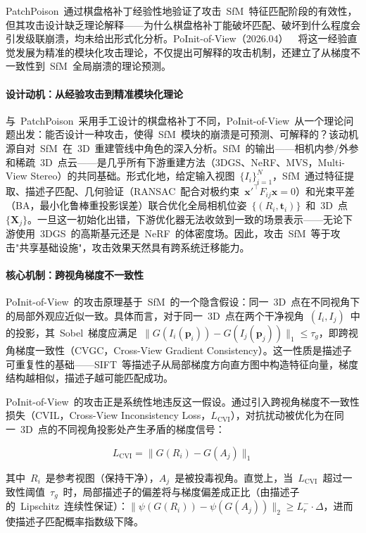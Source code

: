PatchPoison~通过棋盘格补丁经验性地验证了攻击~SfM~特征匹配阶段的有效性，但其攻击设计缺乏理论解释——为什么棋盘格补丁能破坏匹配、破坏到什么程度会引发级联崩溃，均未给出形式化分析。PoInit-of-View（2026.04）~\cite{2604_16540}~将这一经验直觉发展为精准的模块化攻击理论，不仅提出可解释的攻击机制，还建立了从梯度不一致性到~SfM~全局崩溃的理论预测。

\paragraph{设计动机：从经验攻击到精准模块化理论}

与~PatchPoison~采用手工设计的棋盘格补丁不同，PoInit-of-View~从一个理论问题出发：能否设计一种攻击，使得~SfM~模块的崩溃是可预测、可解释的？该动机源自对~SfM~在~3D~重建管线中角色的深入分析。SfM~的输出——相机内参/外参和稀疏~3D~点云——是几乎所有下游重建方法（3DGS、NeRF、MVS，Multi-View Stereo）的共同基础。形式化地，给定输入视图~$\{I_i\}_{i=1}^N$，SfM~通过特征提取、描述子匹配、几何验证（RANSAC~配合对极约束~$\mathbf{x}'^\top F_{ij} \mathbf{x} = 0$）和光束平差（BA，最小化鲁棒重投影误差）联合优化全局相机位姿~$\{(R_i, \mathbf{t}_i)\}$~和~3D~点~$\{\mathbf{X}_j\}$。一旦这一初始化出错，下游优化器无法收敛到一致的场景表示——无论下游使用~3DGS~的高斯基元还是~NeRF~的体密度场。因此，攻击~SfM~等于攻击"共享基础设施"，攻击效果天然具有跨系统迁移能力。

\paragraph{核心机制：跨视角梯度不一致性}

PoInit-of-View~的攻击原理基于~SfM~的一个隐含假设：同一~3D~点在不同视角下的局部外观应近似一致。具体而言，对于同一~3D~点在两个干净视角~$(I_i, I_j)$~中的投影，其~Sobel~梯度应满足~$\|G(I_i(\mathbf{p}_i)) - G(I_j(\mathbf{p}_j))\|_1 \leq \tau_g$，即跨视角梯度一致性（CVGC，Cross-View Gradient Consistency）。这一性质是描述子可重复性的基础——SIFT~等描述子从局部梯度方向直方图中构造特征向量，梯度结构越相似，描述子越可能匹配成功。

PoInit-of-View~的攻击正是系统性地违反这一假设。通过引入跨视角梯度不一致性损失（CVIL，Cross-View Inconsistency Loss，$L_{\text{CVI}}$），对抗扰动被优化为在同一~3D~点的不同视角投影处产生矛盾的梯度信号：

\begin{equation}
L_{\text{CVI}} = \|G(R_i) - G(A_j)\|_1
\end{equation}

其中~$R_i$~是参考视图（保持干净），$A_j$~是被投毒视角。直觉上，当~$L_{\text{CVI}}$~超过一致性阈值~$\tau_g$~时，局部描述子的偏差将与梯度偏差成正比（由描述子的~Lipschitz~连续性保证）：$\|\psi(G(R_i)) - \psi(G(A_j))\|_2 \geq L_r^{-} \cdot \Delta$，进而使描述子匹配概率指数级下降。


